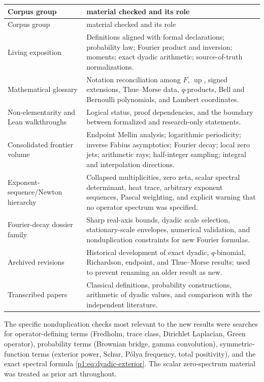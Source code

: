 \documentclass[11pt,oneside]{article}
\theoremstyle{definition}
\newcommand{\Up}{\operatorname{up}}
\begin{document}
\begin{longtable}{>{\raggedright\arraybackslash}p{}
                  >{\raggedright\arraybackslash}p{}}
\toprule
Corpus group&material checked and its role\\
\midrule
\endfirsthead
\toprule
Corpus group&material checked and its role\\
\midrule
\endhead
\bottomrule
\endfoot
Living exposition&Definitions aligned with formal declarations; probability law;
Fourier product and inversion; moments; exact dyadic arithmetic; source-of-truth
normalizations.\\
Mathematical glossary&Notation reconciliation among \(F\), \(\Up\), signed extensions,
Thue--Morse data, \(q\)-products, Bell and Bernoulli polynomials, and Lambert
coordinates.\\
Non-elementarity and Lean walkthroughs&Logical status, proof dependencies, and the
boundary between formalized and research-only statements.\\
Consolidated frontier volume&Endpoint Mellin analysis; logarithmic periodicity;
inverse Fabius asymptotics; Fourier decay; local zero jets; arithmetic rays;
half-integer sampling; integral and interpolation directions.\\
Exponent-sequence/Newton hierarchy&Collapsed multiplicities, zero zeta, scalar
spectral determinant, heat trace, arbitrary exponent sequences, Pascal weighting, and
explicit warning that no operator spectrum was specified.\\
Fourier-decay dossier family&Sharp real-axis bounds, dyadic scale selection,
stationary-scale envelopes, numerical validation, and nonduplication constraints for
new Fourier formulas.\\
Archived revisions&Historical development of exact dyadic, \(q\)-binomial,
Richardson, endpoint, and Thue--Morse results; used to prevent renaming an older result
as new.\\
Transcribed papers&Classical definitions, probability constructions, arithmetic of
dyadic values, and comparison with the independent literature.\\
\end{longtable}

The specific nonduplication checks most relevant to the new results were searches for
operator-defining terms (Fredholm, trace class, Dirichlet Laplacian, Green operator),
probability terms (Brownian bridge, gamma convolution), symmetric-function terms
(exterior power, Schur, P\'olya frequency, total positivity), and the exact spectral
formula \eqref{p1:eq:dyadic-exterior}.  The scalar zero-spectrum material was treated as
prior art throughout.
\end{document}
